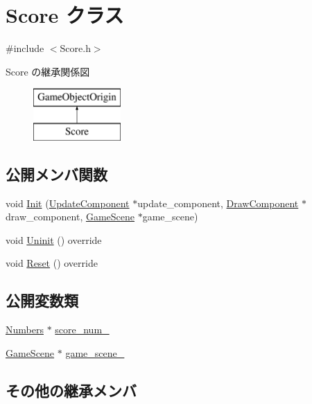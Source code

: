 \hypertarget{class_score}{}\section{Score クラス}
\label{class_score}


{\ttfamily \#include $<$Score.\+h$>$}

Score の継承関係図\begin{figure}[H]
\begin{center}
\leavevmode
\includegraphics[height=2.000000cm]{class_score}
\end{center}
\end{figure}
\subsection*{公開メンバ関数}
\begin{DoxyCompactItemize}
\item 
void \mbox{\hyperlink{class_score_a7ea7580fa6ed65e683d682c637aeee25}{Init}} (\mbox{\hyperlink{class_update_component}{Update\+Component}} $\ast$update\+\_\+component, \mbox{\hyperlink{class_draw_component}{Draw\+Component}} $\ast$draw\+\_\+component, \mbox{\hyperlink{class_game_scene}{Game\+Scene}} $\ast$game\+\_\+scene)
\item 
void \mbox{\hyperlink{class_score_a605e163dc59ccc4d19a3cb6b5db813b8}{Uninit}} () override
\item 
void \mbox{\hyperlink{class_score_ad01d461a2b6ca345858b2ae0a3d81cc1}{Reset}} () override
\end{DoxyCompactItemize}
\subsection*{公開変数類}
\begin{DoxyCompactItemize}
\item 
\mbox{\hyperlink{class_numbers}{Numbers}} $\ast$ \mbox{\hyperlink{class_score_a5d178c5581627f1fa4c06f95f9558dcd}{score\+\_\+num\+\_\+}}
\item 
\mbox{\hyperlink{class_game_scene}{Game\+Scene}} $\ast$ \mbox{\hyperlink{class_score_ada5a957b01fbed0c1bb52cea4e1bcbc4}{game\+\_\+scene\+\_\+}}
\end{DoxyCompactItemize}
\subsection*{その他の継承メンバ}



